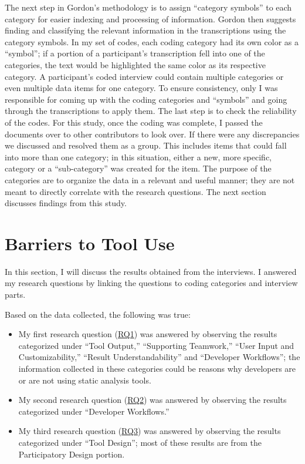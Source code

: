 The next step in Gordon's methodology is to assign ``category symbols'' to each
category for easier indexing and processing of information. Gordon then suggests
finding and classifying the relevant information in the transcriptions using the
category symbols. In my set of codes, each coding category had its own color as a
``symbol''; if a portion of a participant's transcription fell into one of the
categories, the text would be highlighted the same color as its respective
category. A participant's coded interview could contain multiple categories or
even multiple data items for one category. To ensure consistency, only I was
responsible for coming up with the coding categories and ``symbols'' and going
through the transcriptions to apply them. The last step is to check the
reliability of the codes. For this study, once the coding was complete, I passed the documents over to other contributors to look over. 
If there were any discrepancies we discussed and resolved them as a group. This includes items
that could fall into more than one category; in this situation, either a new,
more specific, category or a ``sub-category'' was created for the item. The
purpose of the categories are to organize the data in a relevant and useful
manner; they are not meant to directly correlate with the research questions. 
The next section discusses findings from this study.

\section{Barriers to Tool Use}
\label{sec:barriers}

In this section, I will discuss the results obtained from the interviews. I answered my
research questions by linking the questions to coding categories and interview
parts.

Based on the data collected, the following was true:
\begin{itemize}
    \item My first research question (\hyperlink{RQ1}{RQ1})
was answered by observing the results categorized under ``Tool Output,'' ``Supporting Teamwork,'' ``User Input and
Customizability,'' ``Result Understandability'' and ``Developer Workflows''; the
information collected in these categories could be reasons why developers are or
are not using static analysis tools.
    \item My second research question (\hyperlink{RQ2}{RQ2}) was answered by
observing the results categorized under ``Developer Workflows.''
    \item My third research question (\hyperlink{RQ3}{RQ3}) was answered by
observing the results categorized under ``Tool Design''; most of
these results are from the Participatory Design portion.
\end{itemize}

